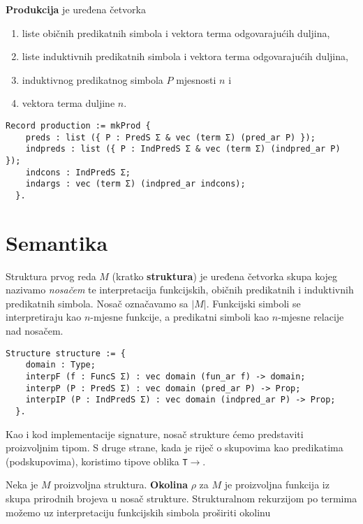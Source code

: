 \begin{definition}
  \textbf{Produkcija} je uređena četvorka
  \begin{enumerate}
  \item liste običnih predikatnih simbola i vektora terma odgovarajućih duljina,
  \item liste induktivnih predikatnih simbola i vektora terma odgovarajućih duljina,
  \item induktivnog predikatnog simbola \(P\) mjesnosti \(n\) i
  \item vektora terma duljine \(n\).
  \end{enumerate}
\end{definition}

\begin{verbatim}
Record production := mkProd {
    preds : list ({ P : PredS Σ & vec (term Σ) (pred_ar P) });
    indpreds : list ({ P : IndPredS Σ & vec (term Σ) (indpred_ar P) });
    indcons : IndPredS Σ;
    indargs : vec (term Σ) (indpred_ar indcons);
  }.
\end{verbatim}

\section{Semantika}\label{sec:semantika}
\begin{definition}
  Struktura prvog reda \(M\) (kratko \textbf{struktura}) je uređena četvorka
  skupa kojeg nazivamo \textit{nosačem} te interpretacija funkcijskih,
  običnih predikatnih i induktivnih predikatnih simbola.
  Nosač označavamo sa \(|M|\). Funkcijski simboli se interpretiraju kao \(n\)-mjesne funkcije, a predikatni simboli kao \(n\)-mjesne relacije nad nosačem.
\begin{verbatim}
Structure structure := {
    domain : Type;
    interpF (f : FuncS Σ) : vec domain (fun_ar f) -> domain;
    interpP (P : PredS Σ) : vec domain (pred_ar P) -> Prop;
    interpIP (P : IndPredS Σ) : vec domain (indpred_ar P) -> Prop;
  }.
\end{verbatim}
\end{definition}
\noindent Kao i kod implementacije signature, nosač strukture ćemo predstaviti proizvoljnim tipom.
S druge strane, kada je riječ o skupovima kao predikatima (podskupovima), koristimo tipove
oblika \texttt{T\(\rightarrow\)\coqprop{}}.


\begin{definition}
  Neka je \(M\) proizvoljna struktura. \textbf{Okolina} \(\rho\) za \(M\) je proizvoljna funkcija iz skupa prirodnih brojeva u nosač strukture.
  Strukturalnom rekurzijom po termima možemo uz interpretaciju funkcijskih simbola proširiti okolinu
\end{definition}

